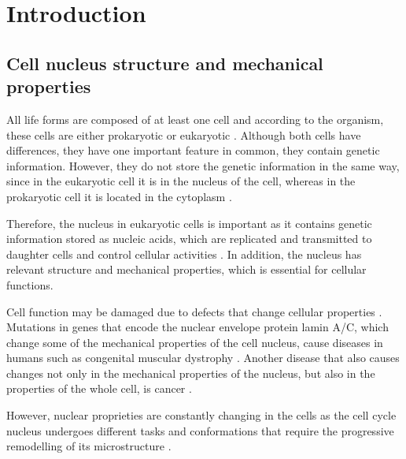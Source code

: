 \documentclass[12pt, a4paper]{article} %
\begin{document}
\section{Introduction}

\subsection{Cell nucleus structure and mechanical properties}

All life forms are composed of at least one cell \cite{mazzarello1999unifying} and according to the organism, these cells are either prokaryotic or eukaryotic \cite{vellai1999origin}. Although both cells have differences, they have one important feature in common, they contain genetic information. However, they do not store the genetic information in the same way, since in the eukaryotic cell it is in the nucleus of the cell, whereas in the prokaryotic cell it is located in the cytoplasm \cite{cook1983mucus}.

\setlength{\parskip}{4mm}

Therefore, the nucleus in eukaryotic cells is important as it contains genetic information stored as nucleic acids, which are replicated and transmitted to daughter cells and control cellular activities \cite{ossareh2001protein}. In addition, the nucleus has relevant structure and mechanical properties, which is essential for cellular functions. 

Cell function may be damaged due to defects that change cellular properties \cite{lammerding2011mechanics}. Mutations in genes that encode the nuclear envelope protein lamin A/C, which change some of the mechanical properties of the cell nucleus, cause diseases in humans such as congenital muscular dystrophy \cite{lammerding2004lamin}. Another disease that also causes changes not only in the mechanical properties of the nucleus, but also in the properties of the whole cell, is cancer \cite{jacobs2012introduction, lekka2019measuring, cross2007nanomechanical}.

However, nuclear proprieties are constantly changing in the cells as the cell cycle nucleus undergoes different tasks and conformations that require the progressive remodelling of its microstructure \cite{liu2017mitosis}.
\end{document}
